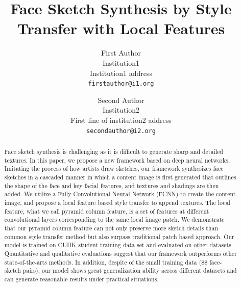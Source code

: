 \documentclass[10pt,twocolumn,letterpaper]{article}
\begin{document}
\title{Face Sketch Synthesis by Style Transfer with Local Features}

\author{First Author\\
Institution1\\
Institution1 address\\
{\tt\small firstauthor@i1.org}
\and
Second Author\\
Institution2\\
First line of institution2 address\\
{\tt\small secondauthor@i2.org}
}

\maketitle


\begin{abstract}

Face sketch synthesis is challenging as it is difficult to generate sharp and detailed textures. In this paper, we propose a new framework based on deep neural networks. Imitating the process of how artists draw sketches, our framework synthesizes face sketches in a cascaded manner in which a content image is first generated that outlines the shape of the face and key facial features, and textures and shadings are then added. We utilize a Fully Convolutional Neural Network (FCNN) to create the content image, and propose a local feature based style transfer to append textures. The local feature, what we call pyramid column feature, is a set of features at different convolutional layers corresponding to the same local image patch. We demonstrate that our pyramid column feature can not only preserve more sketch details than common style transfer method but also surpass traditional patch based approach. Our model is trained on CUHK student training data set and evaluated on other datasets. Quantitative and qualitative evaluations suggest that our framework outperforms other state-of-the-arts methods. In addition, despite of the small training data (88 face-sketch pairs), our model shows great generalization ability across different datasets and can generate reasonable results under practical situations.

\end{abstract}
\end{document}
